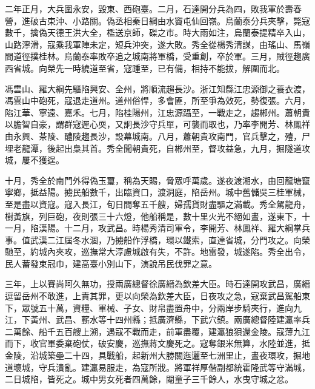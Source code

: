 \begin{pinyinscope}
二年正月，大兵圍永安，毀東、西砲臺。二月，石達開分兵為四，敗我軍於壽春營，進破古束沖、小路關。偽丞相秦日綱由水竇屯仙回嶺。烏蘭泰分兵夾擊，斃寇數千，擒偽天德王洪大全，檻送京師，磔之市。時大雨如注，烏蘭泰提精卒入山，山路濘滑，寇乘我軍陣未定，短兵沖突，遂大敗。秀全從楊秀清謀，由瑤山、馬嶺間道徑撲桂林。烏蘭泰率敗卒追之城南將軍橋，受重創，卒於軍。三月，賊徑趨廣西省城。向榮先一時繞道至省，寇踵至，已有備，相持不能拔，解圍而北。

馮雲山、羅大綱先驅陷興安、全州，將順流趨長沙。浙江知縣江忠源御之蓑衣渡，馮雲山中砲死，寇退走道州。道州俗悍，多會匪，所至爭為效死，勢復張。六月，陷江華、寧遠、嘉禾。七月，陷桂陽州，江忠源躡至，一戰走之，趨郴州。蕭朝貴以膽智自豪，謂群寇遲心耎，又詗長沙守兵單，可襲而取也，乃率李開芳、林鳳祥由永興、茶陵、醴陵趨長沙，設幕城南。八月，蕭朝貴攻南門，官兵擊之，殪，尸埋老龍潭，後起出梟其首。秀全聞朝貴死，自郴州至，督攻益急，九月，掘隧道攻城，屢不獲逞。

十月，秀全於南門外得偽玉璽，稱為天賜，脅眾呼萬歲。遂夜渡湘水，由回龍塘竄寧鄉，抵益陽。擄民船數千，出臨資口，渡洞庭，陷岳州。城中舊儲吳三桂軍械，至是盡以資寇。寇入長江，旬日間奪五千艘，婦孺貨財盡驅之滿載。秀全駕龍舟，樹黃旗，列巨砲，夜則張三十六燈，他船稱是，數十里火光不絕如晝，遂東下，十一月，陷漢陽。十二月，攻武昌。時楊秀清司軍令，李開芳、林鳳祥、羅大綱掌兵事。值武漢二江屆冬水涸，乃擄船作浮橋，環以鐵索，直達省城，分門攻之。向榮馳至，約城內夾攻，巡撫常大淳慮城啟有失，不許。地雷發，城遂陷。秀全出令，民人蓄發束冠巾，建高臺小別山下，演說吊民伐罪之意。

三年，上以賽尚阿久無功，授兩廣總督徐廣縉為欽差大臣。時石達開攻武昌，廣縉逗留岳州不敢進，上責其罪，更以向榮為欽差大臣，日夜攻之急，寇棄武昌駕船東下，眾號五十萬，資糧、軍械、子女、財帛盡置舟中，分兩岸步騎夾行，進向九江，下黃州、武昌、蘄水等十四州縣；抵廣濟縣，下武穴鎮。兩廣總督陸建瀛率兵二萬餘、船千五百艘上溯，遇寇不戰而走，前軍盡覆，建瀛狼狽還金陵。寇薄九江而下，收官軍委棄砲仗，破安慶，巡撫蔣文慶死之。寇奪銀米無算，水陸並進，抵金陵，沿城築壘二十四，具戰船，起新州大勝關迤邐至七洲里止，晝夜環攻，掘地道壞城，守兵潰亂。建瀛易服走，為寇所戕。將軍祥厚偕副都統霍隆武等守滿城，二日城陷，皆死之。城中男女死者四萬餘，閹童子三千餘人，水曳守城之忿。


\end{pinyinscope}
